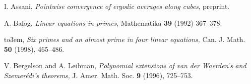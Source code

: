 \documentclass[12pt,a4paper,reqno]{amsart}
\numberwithin{equation}{section}
\theoremstyle{plain}
\theoremstyle{definition}
\def\emph#1{{\it #1}}
\def\textbf#1{{\bf #1}}
\begin{document}
\SNIP


\providecommand{\bysame}{\leavevmode\hbox to3em{\hrulefill}\thinspace}
\providecommand{\MR}{\relax\ifhmode\unskip\space\fi MR }
\providecommand{\MRhref}[2]{%
  \href{http://www.ams.org/mathscinet-getitem?mr=#1}{#2}
}
\providecommand{\href}[2]{#2}
\begin{thebibliography}{10}

I. Assani, \emph{Pointwise convergence of ergodic averages along cubes}, preprint.

 A. Balog, \emph{Linear equations in primes,} Mathematika \textbf{39} (1992) 367--378.

 \bysame, \emph{Six primes and an almost prime in four linear equations,} Can. J. Math. \textbf{50} (1998), 465--486.

 V. Bergelson and A. Leibman, \emph{Polynomial extensions of van der Waerden's and Szemer\'edi's theorems,} J. Amer. Math. Soc. \textbf{9} (1996), 725--753.

\SNIP

\end{thebibliography}
\end{document}
